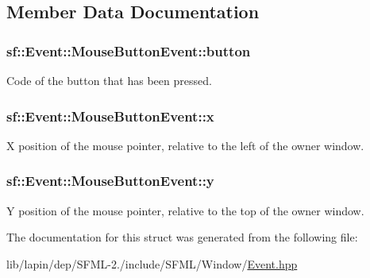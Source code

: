 \subsection{Member Data Documentation}
\hypertarget{structsf_1_1_event_1_1_mouse_button_event_a5f53725aa7b647705486eeb95f723024}{
\subsubsection[{button}]{ sf\-::\-Event\-::\-Mouse\-Button\-Event\-::button}}\label{structsf_1_1_event_1_1_mouse_button_event_a5f53725aa7b647705486eeb95f723024}


Code of the button that has been pressed. 

\hypertarget{structsf_1_1_event_1_1_mouse_button_event_a49b937b311729174950787781aafcdc7}{
\subsubsection[{x}]{ sf\-::\-Event\-::\-Mouse\-Button\-Event\-::x}}\label{structsf_1_1_event_1_1_mouse_button_event_a49b937b311729174950787781aafcdc7}


X position of the mouse pointer, relative to the left of the owner window. 

\hypertarget{structsf_1_1_event_1_1_mouse_button_event_aae4735071868d4411d1782bf67619d64}{
\subsubsection[{y}]{ sf\-::\-Event\-::\-Mouse\-Button\-Event\-::y}}\label{structsf_1_1_event_1_1_mouse_button_event_aae4735071868d4411d1782bf67619d64}


Y position of the mouse pointer, relative to the top of the owner window. 



The documentation for this struct was generated from the following file\-:\begin{DoxyCompactItemize}
\item 
lib/lapin/dep/\-S\-F\-M\-L-\/2./include/\-S\-F\-M\-L/\-Window/\hyperlink{lib_2lapin_2dep_2_s_f_m_l-2_83_2include_2_s_f_m_l_2_window_2_event_8hpp}{Event.\-hpp}\end{DoxyCompactItemize}
